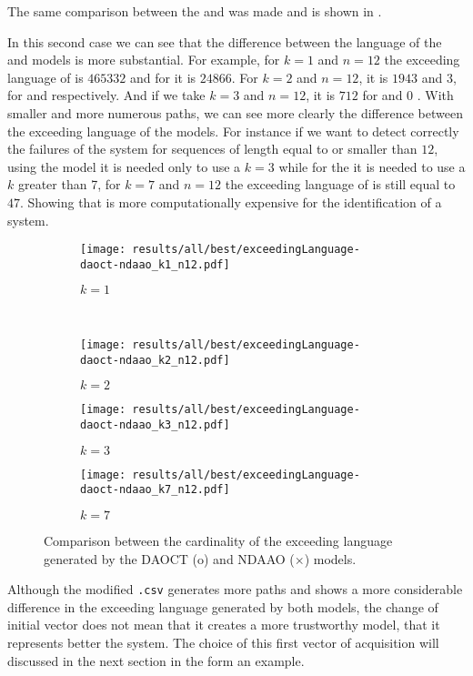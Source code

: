 The same comparison between the \DAOCT{} and \NDAAO{} was made and is shown in .

In this second case we can see that the difference between the language of the \DAOCT{} and
\NDAAO{} models is more substantial. For example, for $k=1$ and $n=12$ the
exceeding language of \NDAAO{} is $465332$ and for \DAOCT{} it is $24866$. For
$k=2$ and $n=12$, it is $1943$ and $3$, for \NDAAO{} and \DAOCT{} respectively. And
if we take $k=3$ and $n=12$, it is $712$ for \NDAAO{} and $0$ \DAOCT{}. With
smaller and more numerous paths, we can see more clearly the difference between the
exceeding language of the models. For instance if we want to detect correctly
the failures of the system for sequences of length equal to or smaller
than $12$, using the \DAOCT{} model it is needed only to use a $k=3$ while for the
\NDAAO{} it is needed to use a $k$ greater than 7, for $k=7$ and $n=12$ the
exceeding language of \NDAAO{} is still equal to $47$. Showing that \NDAAO{} is more
computationally expensive for the identification of a system.

\begin{figure}[H]
  \begin{subfigure}[H]{0.5\textwidth}
    \centering
    \texttt{[image: results/all/best/exceedingLanguage-daoct-ndaao\_k1\_n12.pdf]}
    \caption{$k=1$}
    \label{fig:daoctNdaaoBestkone}
  \end{subfigure}
  ~
  \begin{subfigure}[h]{0.5\textwidth}
    \centering
    \texttt{[image: results/all/best/exceedingLanguage-daoct-ndaao\_k2\_n12.pdf]}
    \caption{$k=2$}
    \label{fig:daoctNdaaoBestktwo}
  \end{subfigure}
  \begin{subfigure}[h]{0.5\textwidth}
    \centering
    \texttt{[image: results/all/best/exceedingLanguage-daoct-ndaao\_k3\_n12.pdf]}
    \caption{$k=3$}
    \label{fig:daoctNdaaoBestkthree}
  \end{subfigure}
  \begin{subfigure}[h]{0.5\textwidth}
    \centering
    \texttt{[image: results/all/best/exceedingLanguage-daoct-ndaao\_k7\_n12.pdf]}
    \caption{$k=7$}
    \label{fig:daoctNdaaoBestkseven}
  \end{subfigure}
  \caption{Comparison between the cardinality of the exceeding language generated by the DAOCT (o) and
NDAAO ($\times$) models.}
\end{figure}
Although the modified \verb|.csv| generates more paths and shows a more
considerable difference in the exceeding language generated by both models, the
change of initial vector does not mean that it creates a more trustworthy model,
that it represents better the
system. The choice of this first vector of acquisition will discussed in the
next section in the form an example.
\newpage
